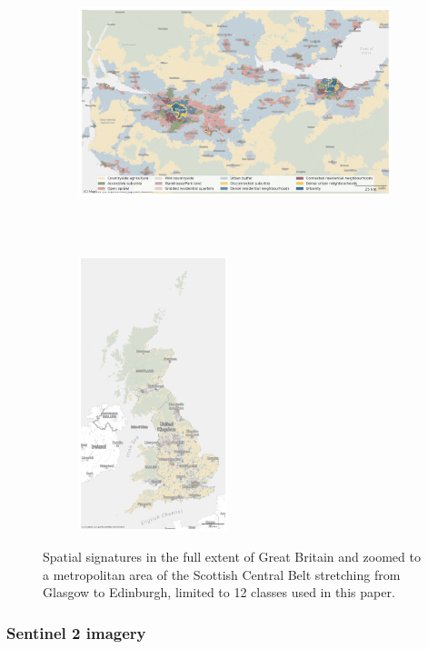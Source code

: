 \begin{figure}
    \centering
    \begin{subfigure}[b]{0.8\textwidth}
        \centering
        \includegraphics[height=8cm]{fig/signatures_scottish_belt_12_classes.png}
     \end{subfigure}
    \hfill
    \begin{subfigure}[b]{0.19\textwidth}
        \centering
        \includegraphics[height=8cm]{fig/signatures_gb_12_classes.png}
    \end{subfigure}
\caption{Spatial signatures in the full extent of Great Britain and zoomed to a
metropolitan area of the Scottish Central Belt stretching from Glasgow to Edinburgh,
limited to 12 classes used in this paper.}
\label{fig:signatures}
\end{figure}


\subsubsection{Sentinel 2 imagery}

